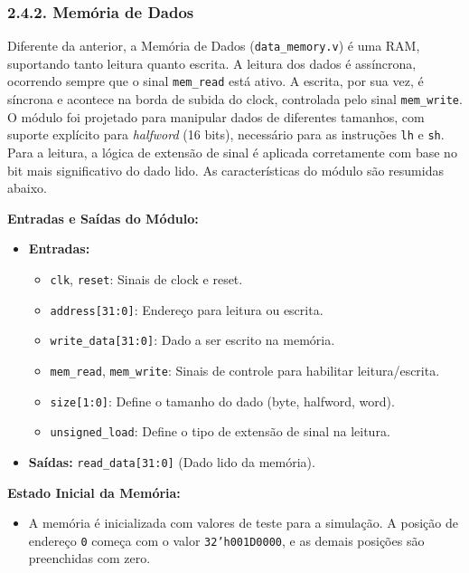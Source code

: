 \documentclass[12pt, a4paper]{article}
\begin{document}
\subsubsection*{2.4.2. Memória de Dados}

Diferente da anterior, a Memória de Dados (\texttt{data\_memory.v}) é uma RAM, suportando tanto leitura quanto escrita. A leitura dos dados é assíncrona, ocorrendo sempre que o sinal \texttt{mem\_read} está ativo. A escrita, por sua vez, é síncrona e acontece na borda de subida do clock, controlada pelo sinal \texttt{mem\_write}.
\\[0.5cm]
O módulo foi projetado para manipular dados de diferentes tamanhos, com suporte explícito para \textit{halfword} (16 bits), necessário para as instruções \texttt{lh} e \texttt{sh}. Para a leitura, a lógica de extensão de sinal é aplicada corretamente com base no bit mais significativo do dado lido. As características do módulo são resumidas abaixo.

\vspace{0.5cm} %
\textbf{Entradas e Saídas do Módulo:}
\begin{itemize}
    \item \textbf{Entradas:}
    \begin{itemize}
        \item \texttt{clk}, \texttt{reset}: Sinais de clock e reset.
        \item \texttt{address[31:0]}: Endereço para leitura ou escrita.
        \item \texttt{write\_data[31:0]}: Dado a ser escrito na memória.
        \item \texttt{mem\_read}, \texttt{mem\_write}: Sinais de controle para habilitar leitura/escrita.
        \item \texttt{size[1:0]}: Define o tamanho do dado (byte, halfword, word).
        \item \texttt{unsigned\_load}: Define o tipo de extensão de sinal na leitura.
    \end{itemize}
    \item \textbf{Saídas:} \texttt{read\_data[31:0]} (Dado lido da memória).
\end{itemize}

\textbf{Estado Inicial da Memória:}
\begin{itemize}
    \item A memória é inicializada com valores de teste para a simulação. A posição de endereço \texttt{0} começa com o valor \texttt{32'h001D0000}, e as demais posições são preenchidas com zero.
\end{itemize}
\end{document}

